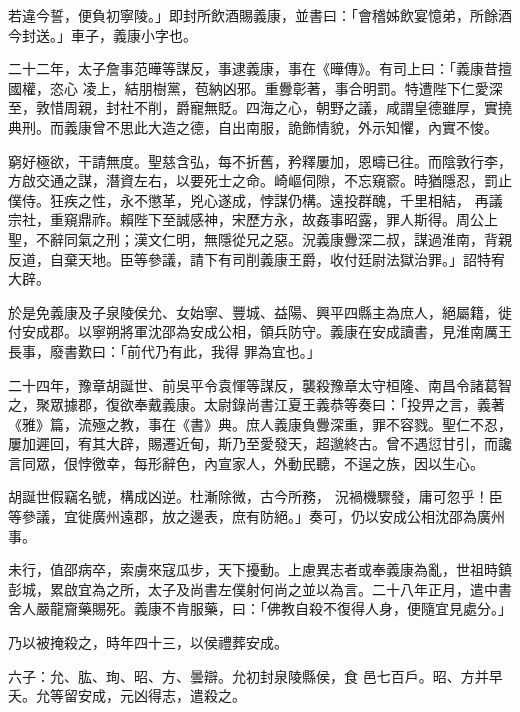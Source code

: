 \begin{pinyinscope}
 若違今誓，便負初寧陵。」即封所飲酒賜義康，並書曰：「會稽姊飲宴憶弟，所餘酒今封送。」車子，義康小字也。



 二十二年，太子詹事范曄等謀反，事逮義康，事在《曄傳》。有司上曰：「義康昔擅國權，恣心
 凌上，結朋樹黨，苞納凶邪。重釁彰著，事合明罰。特遭陛下仁愛深至，敦惜周親，封社不削，爵寵無貶。四海之心，朝野之議，咸謂皇德雖厚，實撓典刑。而義康曾不思此大造之德，自出南服，詭飾情貌，外示知懼，內實不悛。



 窮好極欲，干請無度。聖慈含弘，每不折舊，矜釋屢加，恩疇已往。而陰敦行李，方啟交通之謀，潛資左右，以要死士之命。崎嶇伺隙，不忘窺窬。時猶隱忍，罰止僕侍。狂疾之性，永不懲革，兇心遂成，悖謀仍構。遠投群醜，千里相結，
 再議宗社，重窺鼎祚。賴陛下至誠感神，宋歷方永，故姦事昭露，罪人斯得。周公上聖，不辭同氣之刑；漢文仁明，無隱從兄之惡。況義康釁深二叔，謀過淮南，背親反道，自棄天地。臣等參議，請下有司削義康王爵，收付廷尉法獄治罪。」詔特宥大辟。



 於是免義康及子泉陵侯允、女始寧、豐城、益陽、興平四縣主為庶人，絕屬籍，徙付安成郡。以寧朔將軍沈邵為安成公相，領兵防守。義康在安成讀書，見淮南厲王長事，廢書歎曰：「前代乃有此，我得
 罪為宜也。」



 二十四年，豫章胡誕世、前吳平令袁惲等謀反，襲殺豫章太守桓隆、南昌令諸葛智之，聚眾據郡，復欲奉戴義康。太尉錄尚書江夏王義恭等奏曰：「投畀之言，義著《雅》篇，流殛之教，事在《書》典。庶人義康負釁深重，罪不容戮。聖仁不忍，屢加遲回，宥其大辟，賜遷近甸，斯乃至愛發天，超邈終古。曾不遇愆甘引，而讒言同眾，佷悖徼幸，每形辭色，內宣家人，外動民聽，不逞之族，因以生心。



 胡誕世假竊名號，構成凶逆。杜漸除微，古今所務，
 況禍機驟發，庸可忽乎！臣等參議，宜徙廣州遠郡，放之邊表，庶有防絕。」奏可，仍以安成公相沈邵為廣州事。



 未行，值邵病卒，索虜來寇瓜步，天下擾動。上慮異志者或奉義康為亂，世祖時鎮彭城，累啟宜為之所，太子及尚書左僕射何尚之並以為言。二十八年正月，遣中書舍人嚴龍齎藥賜死。義康不肯服藥，曰：「佛教自殺不復得人身，便隨宜見處分。」



 乃以被掩殺之，時年四十三，以侯禮葬安成。



 六子：允、肱、珣、昭、方、曇辯。允初封泉陵縣侯，食
 邑七百戶。昭、方并早夭。允等留安成，元凶得志，遣殺之。




\end{pinyinscope}
